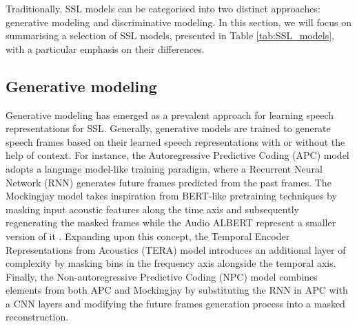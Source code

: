 Traditionally, SSL models can be categorised into two distinct approaches: generative modeling and discriminative modeling. In this section, we will focus on summarising a selection of SSL models, presented in Table \ref{tab:SSL_models}, with a particular emphasis on their differences.

\subsection{Generative modeling}
Generative modeling has emerged as a prevalent approach for learning speech representations for SSL. Generally, generative models are trained to generate speech frames based on their learned speech representations with or without the help of context. For instance, the Autoregressive Predictive Coding (APC) model \cite{chung19_interspeech} adopts a language model-like training paradigm, where a Recurrent Neural Network (RNN) generates future frames predicted from the past frames. 
The Mockingjay model \cite{mockingjay} takes inspiration from BERT-like pretraining techniques by masking input acoustic features along the time axis and subsequently regenerating the masked frames while the Audio ALBERT represent a smaller version of it \cite{chi2021audio}. Expanding upon this concept, the Temporal Encoder Representations from Acoustics (TERA) model \cite{liu2021tera} introduces an additional layer of complexity by masking bins in the frequency axis alongside the temporal axis. Finally, the Non-autoregressive Predictive Coding (NPC) model \cite{liu21l_interspeech} combines elements from both APC and Mockingjay by substituting the RNN in APC with a CNN layers and modifying the future frames generation process into a masked reconstruction.

